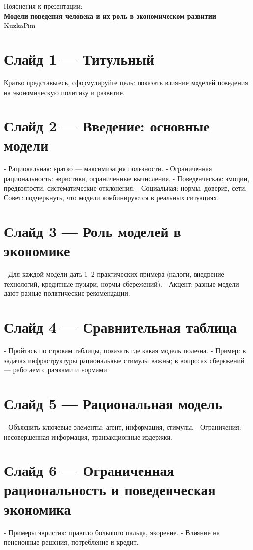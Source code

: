 \documentclass[12pt]{article}
\begin{document}
\begin{center}
  {\LARGE Пояснения к презентации: \\
  \textbf{Модели поведения человека и их роль в экономическом развитии}}\\[8pt]
  KuzkaPim
\end{center}

\section*{Слайд 1 — Титульный}
Кратко представьтесь, сформулируйте цель: показать влияние моделей поведения на экономическую политику и развитие.

\section*{Слайд 2 — Введение: основные модели}
- Рациональная: кратко — максимизация полезности.
- Ограниченная рациональность: эвристики, ограниченные вычисления.
- Поведенческая: эмоции, предвзятости, систематические отклонения.
- Социальная: нормы, доверие, сети.
Совет: подчеркнуть, что модели комбинируются в реальных ситуациях.

\section*{Слайд 3 — Роль моделей в экономике}
- Для каждой модели дать 1–2 практических примера (налоги, внедрение технологий, кредитные пузыри, нормы сбережений).
- Акцент: разные модели дают разные политические рекомендации.

\section*{Слайд 4 — Сравнительная таблица}
- Пройтись по строкам таблицы, показать где какая модель полезна.
- Пример: в задачах инфраструктуры рациональные стимулы важны; в вопросах сбережений — работаем с рамками и нормами.

\section*{Слайд 5 — Рациональная модель}
- Объяснить ключевые элементы: агент, информация, стимулы.
- Ограничения: несовершенная информация, транзакционные издержки.

\section*{Слайд 6 — Ограниченная рациональность и поведенческая экономика}
- Примеры эвристик: правило большого пальца, якорение.
- Влияние на пенсионные решения, потребление и кредит.
\end{document}
